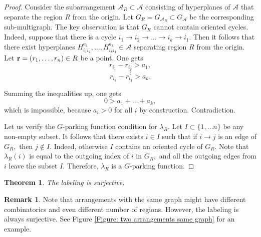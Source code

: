 \documentclass[12pt]{amsart}
\newtheorem{theorem}{Theorem}[section]
\theoremstyle{definition}
\newtheorem{remark}{Remark}
\begin{document}
\begin{proof}
Consider the subarrangement ${\mathcal A}_R\subset {\mathcal A}$ consisting of hyperplanes of ${\mathcal A}$ that separate the region $R$ from the origin. Let $G_R=G_{{\mathcal A}_R}\subset G_{\mathcal A}$ be the corresponding sub-multigraph. The key observation is that $G_R$ cannot contain oriented cycles. Indeed, suppose that there is a cycle $i_1\rightarrow i_2\rightarrow\ldots\rightarrow i_k\rightarrow i_1.$ Then it follows that there exist hyperplanes $H_{i_1i_2}^{a_1},\ldots,H_{i_ki_1}^{a_k}\in {\mathcal A}$ separating region $R$ from the origin. Let ${\bf r}=(r_1,\ldots,r_n)\in R$ be a point. One gets
$$
r_{i_1}-r_{i_2}>a_1,
$$
$$
\vdots
$$
$$
r_{i_k}-r_{i_1}>a_k.
$$

Summing the inequalities up, one gets
$$
0>a_1+\ldots+a_k,
$$
which is impossible, because $a_i>0$ for all $i$ by construction. Contradiction.

Let us verify the $G$-parking function condition for $\lambda_R.$ Let $I\subset\{1,\ldots n\}$ be any non-empty subset. It follows that there exists $i\in I$ such that if $i\rightarrow j$ is an edge of $G_R,$ then $j\notin I.$ Indeed, otherwise $I$ contains an oriented cycle of $G_R.$ Note that $\lambda_R(i)$ is equal to the outgoing index of $i$ in $G_R,$ and all the outgoing edges from $i$ leave the subset $I.$ Therefore, $\lambda_R$ is a $G$-parking function.  
\end{proof}

\begin{theorem}\label{Theorem: surjectivity}
The labeling is surjective.
\end{theorem}

\begin{remark}
Note that arrangements with the same graph might have different combinatorics and even different number of regions. However, the labeling is always surjective. See Figure \ref{Figure: two arrangements same graph} for an example.
\end{remark}
\end{document}
